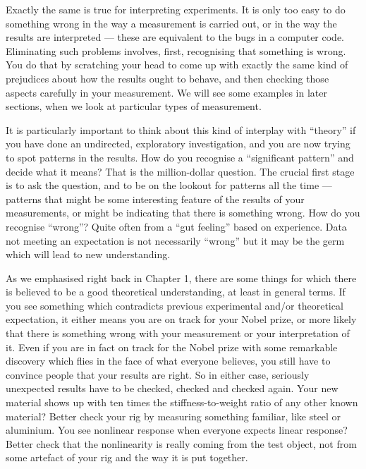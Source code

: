   Exactly the same is true for interpreting experiments. It is only too easy to 
  do something wrong in the way a measurement is carried out, or in the way the 
  results are interpreted — these are equivalent to the bugs in a computer 
  code. Eliminating such problems involves, first, recognising that something 
  is wrong. You do that by scratching your head to come up with exactly the 
  same kind of prejudices about how the results ought to behave, and then 
  checking those aspects carefully in your measurement. We will see some 
  examples in later sections, when we look at particular types of measurement. 

  It is particularly important to think about this kind of interplay with 
  “theory” if you have done an undirected, exploratory investigation, and you 
  are now trying to spot patterns in the results. How do you recognise a 
  “significant pattern” and decide what it means? That is the million-dollar 
  question. The crucial first stage is to ask the question, and to be on the 
  lookout for patterns all the time — patterns that might be some interesting 
  feature of the results of your measurements, or might be indicating that 
  there is something wrong. How do you recognise “wrong”? Quite often from a 
  “gut feeling” based on experience. Data not meeting an expectation is not 
  necessarily “wrong” but it may be the germ which will lead to new 
  understanding. 

  As we emphasised right back in Chapter 1, there are some things for which 
  there is believed to be a good theoretical understanding, at least in general 
  terms. If you see something which contradicts previous experimental and/or 
  theoretical expectation, it either means you are on track for your Nobel 
  prize, or more likely that there is something wrong with your measurement or 
  your interpretation of it. Even if you are in fact on track for the Nobel 
  prize with some remarkable discovery which flies in the face of what everyone 
  believes, you still have to convince people that your results are right. So 
  in either case, seriously unexpected results have to be checked, checked and 
  checked again. Your new material shows up with ten times the 
  stiffness-to-weight ratio of any other known material? Better check your rig 
  by measuring something familiar, like steel or aluminium. You see nonlinear 
  response when everyone expects linear response? Better check that the 
  nonlinearity is really coming from the test object, not from some artefact of 
  your rig and the way it is put together. 

